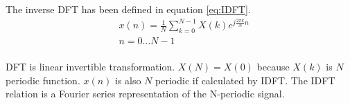 The inverse DFT has been defined in equation \ref{eq:IDFT}.
\begin{equation}
  \label{eq:IDFT}
  \begin{aligned}
    & x(n) = \frac{1}{N}\sum_{k=0}^{N-1}X(k)e^{j\frac{2\pi k}{N}n}\\
    & n = 0 \dots N-1 \\
  \end{aligned}
\end{equation}

DFT is linear invertible transformation. $X(N) = X(0)$ because $X(k)$ is 
$N$ periodic function. $x(n)$ is also $N$ periodic if calculated by IDFT.
The IDFT relation is a Fourier series representation of the N-periodic signal. 

